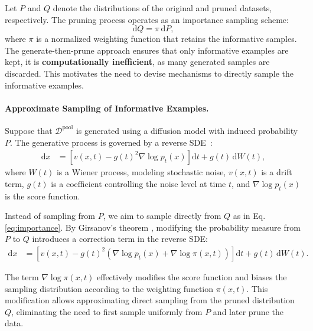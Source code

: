 Let $P$ and $Q$ denote the distributions of the original and pruned datasets, respectively. The pruning process operates as an importance sampling scheme:
\begin{equation}
    \label{eq:importance}
    \mathrm{d} Q = \pi \, \mathrm{d} P,
\end{equation}
where $\pi$ is a normalized weighting function that retains the  informative samples. The generate-then-prune approach ensures that only informative examples are kept, it is \textbf{computationally inefficient}, as many generated samples are discarded. This motivates the need to devise mechanisms to directly sample the informative examples.

\paragraph{Approximate  Sampling of Informative Examples.}
Suppose that \( \mathcal{D}^{\text{pool}} \) is generated using a diffusion model with induced probability \( P \). The generative process is governed by a reverse SDE~\citep{song2019generative}:
{
\begin{equation}
\begin{aligned}
    \mathrm{d} x &= \left[v(x, t) - g(t)^2 \nabla \log p_t(x) \right] \mathrm{d} t + g(t) \, \mathrm{d} W(t),
\end{aligned}
\label{eq:standard-reverse}
\end{equation}}
where \( W(t) \) is a Wiener process, modeling stochastic noise, \( v(x, t) \) is a drift term, \( g(t) \) is a coefficient controlling the noise level at time \( t \), and \( \nabla \log p_t(x) \) is the score function.

Instead of sampling from \( P \), we aim to sample directly from \( Q \) as in Eq. \eqref{eq:importance}. By Girsanov’s theorem \citep{oksendal2013stochastic}, modifying the probability measure from \( P \) to \( Q \) introduces a correction term in the reverse SDE:
{
\begin{equation}
\begin{aligned}
    \mathrm{d} x &= \left[v(x, t) - g(t)^2 (\nabla \log p_t(x) + \nabla \log \pi(x, t)) \right] \mathrm{d} t
     + g(t) \, \mathrm{d} W(t).
\end{aligned}
\label{eq:modified-reverse}
\end{equation}}

The term \( \nabla \log \pi(x, t) \) effectively modifies the score function and biases the sampling distribution according to the weighting function \( \pi(x, t) \).  This modification allows approximating direct sampling from the pruned distribution \( Q \), eliminating the need to first sample uniformly from \( P \) and later prune the data.

